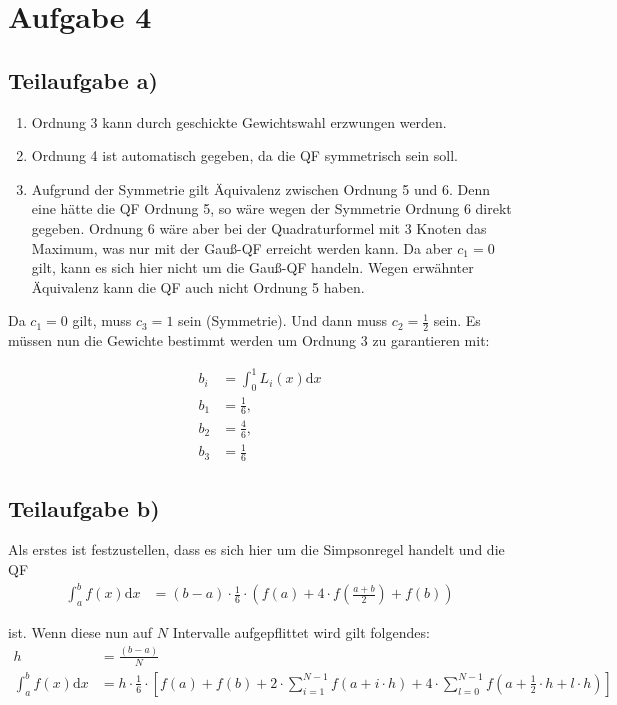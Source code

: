 \section*{Aufgabe 4}
\subsection*{Teilaufgabe a)}
\begin{enumerate}
    \item Ordnung 3 kann durch geschickte Gewichtswahl erzwungen werden.
    \item Ordnung 4 ist automatisch gegeben, da die QF symmetrisch sein soll.
    \item Aufgrund der Symmetrie gilt Äquivalenz zwischen Ordnung 5 und 6.
          Denn eine hätte die QF Ordnung 5, so wäre wegen der
          Symmetrie Ordnung 6 direkt gegeben. Ordnung 6 wäre aber
          bei der Quadraturformel mit 3 Knoten das Maximum, was nur
          mit der Gauß-QF erreicht werden kann. Da aber $c_1 = 0$ gilt,
          kann es sich hier nicht um die Gauß-QF handeln. Wegen
          erwähnter Äquivalenz kann die QF auch nicht Ordnung 5 haben.
\end{enumerate}

Da $c_1 = 0$ gilt, muss $c_3 = 1$ sein (Symmetrie). Und dann muss $c_2 = \frac{1}{2}$
sein. Es müssen nun die Gewichte bestimmt werden um Ordnung 3 zu
garantieren mit:

\begin{align}
    b_i &= \int_0^1 L_i(x) \mathrm{d}x\\
    b_1 &= \frac{1}{6},\\
    b_2 &= \frac{4}{6},\\
    b_3 &= \frac{1}{6}
\end{align}

\subsection*{Teilaufgabe b)}
Als erstes ist festzustellen, dass es sich hier um die Simpsonregel handelt und die QF
\begin{align}
    \int_a^b f(x) \mathrm{d}x &= (b-a) \cdot \frac{1}{6} \cdot \left ( f(a) + 4 \cdot f(\frac{a+b}{2}) + f(b) \right )
\end{align}

ist. Wenn diese nun auf $N$ Intervalle aufgepflittet wird gilt folgendes:
\begin{align}
	h &= \frac{(b-a)}{N} \\
	\int_a^b f(x) \mathrm{d}x &= h \cdot \frac{1}{6} \cdot \left [ f(a) + f(b) + 2 \cdot \sum_{i=1}^{N-1} f(a + i \cdot h) + 4 \cdot \sum_{l=0}^{N-1} f(a + \frac{1}{2} \cdot h + l \cdot h)\right ]
\end{align}

